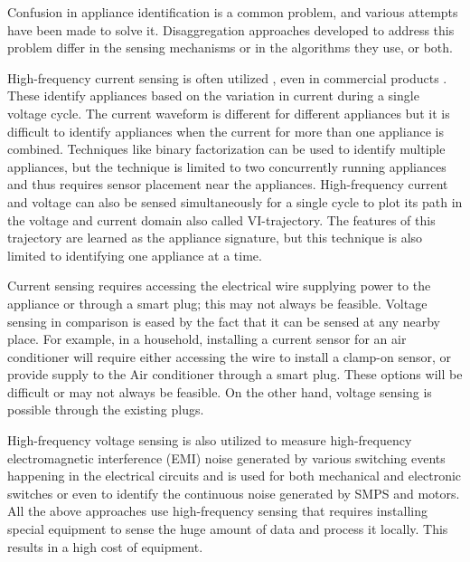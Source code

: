 Confusion in appliance identification is a common problem, and various attempts have been made to solve it. Disaggregation approaches developed to address this problem differ in the sensing mechanisms or in the algorithms they use, or both.

High-frequency current sensing is often utilized \cite{patelFlickSwitchDetecting2007}, even in commercial products \cite{SmartBuildingManagement}. These identify appliances based on the variation in current during a single voltage cycle. The current waveform is different for different appliances but it is difficult to identify appliances when the current for more than one appliance is combined. Techniques like binary factorization \cite{langeBOLTEnergyDisaggregation2016} can be used to identify multiple appliances, but the technique is limited to two concurrently running appliances and thus requires sensor placement near the appliances.
High-frequency current and voltage can also be sensed simultaneously for a single cycle \cite{hassanEmpiricalInvestigationVI2014} to plot its path in the voltage and current domain also called VI-trajectory. The features of this trajectory are learned as the appliance signature, but this technique is also limited to identifying one appliance at a time.

Current sensing requires accessing the electrical wire supplying power to the appliance or through a smart plug; this may not always be feasible. Voltage sensing in comparison is eased by the fact that it can be sensed at any nearby place. For example, in a household, installing a current sensor for an air conditioner will require either accessing the wire to install a clamp-on sensor, or provide supply to the Air conditioner through a smart plug. These options will be difficult or may not always be feasible. On the other hand, voltage sensing is possible through the existing plugs.

High-frequency voltage sensing is also utilized to measure high-frequency electromagnetic interference (EMI) noise generated by various switching events happening in the electrical circuits and is used for both mechanical \cite{guptaElectriSenseSinglepointSensing2010} and electronic switches \cite{chenWhatCanWe2015} or even to identify the continuous noise generated by SMPS and motors. All the above approaches use high-frequency sensing that requires installing special equipment to sense the huge amount of data and process it locally. This results in a high cost of equipment.

